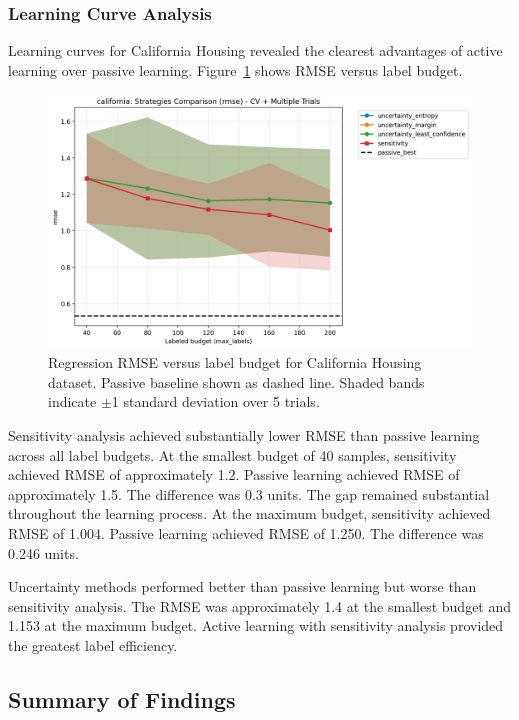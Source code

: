 \documentclass[conference]{IEEEtran}
\begin{document}
\subsubsection{Learning Curve Analysis}

Learning curves for California Housing revealed the clearest advantages of active learning over passive learning. Figure~\ref{fig:california-compare} shows RMSE versus label budget.

\begin{figure}[t]
\centering
\includegraphics[width=0.95\columnwidth]{figures/reg_california_comparison_rmse.png}
\caption{Regression RMSE versus label budget for California Housing dataset. Passive baseline shown as dashed line. Shaded bands indicate $\pm$1 standard deviation over 5 trials.}
\label{fig:california-compare}
\end{figure}

Sensitivity analysis achieved substantially lower RMSE than passive learning across all label budgets. At the smallest budget of 40 samples, sensitivity achieved RMSE of approximately 1.2. Passive learning achieved RMSE of approximately 1.5. The difference was 0.3 units. The gap remained substantial throughout the learning process. At the maximum budget, sensitivity achieved RMSE of 1.004. Passive learning achieved RMSE of 1.250. The difference was 0.246 units.

Uncertainty methods performed better than passive learning but worse than sensitivity analysis. The RMSE was approximately 1.4 at the smallest budget and 1.153 at the maximum budget. Active learning with sensitivity analysis provided the greatest label efficiency.

\subsection{Summary of Findings}
\end{document}
